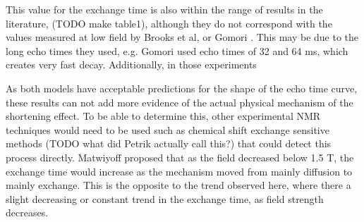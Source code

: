 This value for the exchange time is also within the range of results in the literature, (TODO make table1), although they do not correspond with the values measured at low field by Brooks et al\cite{BrooksComparisont2relaxation1995}, or Gomori \cite{GomoriNMRRelaxationTimes1987}.
This may be due to the long echo times they used, e.g. Gomori used echo times of 32 and 64 ms, which creates very fast \Ttwo decay.
Additionally, in those experiments

As both models have acceptable predictions for the shape of the echo time curve, these results can not add more evidence of the actual physical mechanism of the \Ttwo shortening effect.
To be able to determine this, other experimental NMR techniques would need to be used such as chemical shift exchange sensitive methods (TODO what did Petrik actually call this?) that could detect this process directly.
Matwiyoff \cite{Matwiyofflineshapeswater1990} proposed that as the field decreased below 1.5 T, the exchange time would increase as the mechanism moved from mainly diffusion to mainly exchange.
This is the opposite to the trend observed here, where there a slight decreasing or constant trend in the exchange time, as field strength decreases.
